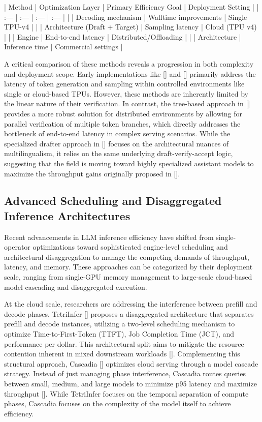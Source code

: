 \documentclass[11pt]{article}
\begin{document}
| Method | Optimization Layer | Primary Efficiency Goal | Deployment Setting |
| :--- | :--- | :--- | :--- |
| \citep{2211.17192} | Decoding mechanism | Walltime improvements | Single TPU-v4 |
| \citep{2302.01318} | Architecture (Draft + Target) | Sampling latency | Cloud (TPU v4) |
| \citep{2305.09781} | Engine | End-to-end latency | Distributed/Offloading |
| \citep{2406.16758} | Architecture | Inference time | Commercial settings |

A critical comparison of these methods reveals a progression in both complexity and deployment scope. Early implementations like [\citep{2211.17192}] and [\citep{2302.01318}] primarily address the latency of token generation and sampling within controlled environments like single or cloud-based TPUs. However, these methods are inherently limited by the linear nature of their verification. In contrast, the tree-based approach in [\citep{2305.09781}] provides a more robust solution for distributed environments by allowing for parallel verification of multiple token branches, which directly addresses the bottleneck of end-to-end latency in complex serving scenarios. While the specialized drafter approach in [\citep{2406.16758}] focuses on the architectural nuances of multilingualism, it relies on the same underlying draft-verify-accept logic, suggesting that the field is moving toward highly specialized assistant models to maximize the throughput gains originally proposed in [\citep{2211.17192}].

\subsection{Advanced Scheduling and Disaggregated Inference Architectures}

Recent advancements in LLM inference efficiency have shifted from single-operator optimizations toward sophisticated engine-level scheduling and architectural disaggregation to manage the competing demands of throughput, latency, and memory. These approaches can be categorized by their deployment scale, ranging from single-GPU memory management to large-scale cloud-based model cascading and disaggregated execution.

At the cloud scale, researchers are addressing the interference between prefill and decode phases. TetriInfer [\citep{2401.11181}] proposes a disaggregated architecture that separates prefill and decode instances, utilizing a two-level scheduling mechanism to optimize Time-to-First-Token (TTFT), Job Completion Time (JCT), and performance per dollar. This architectural split aims to mitigate the resource contention inherent in mixed downstream workloads [\citep{2401.11181}]. Complementing this structural approach, Cascadia [\citep{2506.04203}] optimizes cloud serving through a model cascade strategy. Instead of just managing phase interference, Cascadia routes queries between small, medium, and large models to minimize p95 latency and maximize throughput [\citep{2506.04203}]. While TetriInfer focuses on the temporal separation of compute phases, Cascadia focuses on the complexity of the model itself to achieve efficiency.
\end{document}
